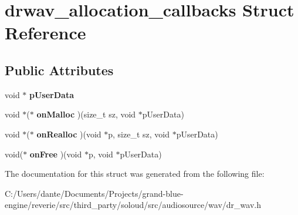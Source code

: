 \hypertarget{structdrwav__allocation__callbacks}{}\section{drwav\+\_\+allocation\+\_\+callbacks Struct Reference}
\label{structdrwav__allocation__callbacks}
\subsection*{Public Attributes}
\begin{DoxyCompactItemize}
\item 
\mbox{\label{structdrwav__allocation__callbacks_a8a89a9b5010d65bbf19c1cd128c5648c}} 
void $\ast$ {\bfseries p\+User\+Data}
\item 
\mbox{\label{structdrwav__allocation__callbacks_a74df91cadaae58ef5c33f243049e449a}} 
void $\ast$($\ast$ {\bfseries on\+Malloc} )(size\+\_\+t sz, void $\ast$p\+User\+Data)
\item 
\mbox{\label{structdrwav__allocation__callbacks_a41d2ba99f082ac22392d50357044ff02}} 
void $\ast$($\ast$ {\bfseries on\+Realloc} )(void $\ast$p, size\+\_\+t sz, void $\ast$p\+User\+Data)
\item 
\mbox{\label{structdrwav__allocation__callbacks_acad0ac9ca0b3c5dbb3dc6448d6c5e048}} 
void($\ast$ {\bfseries on\+Free} )(void $\ast$p, void $\ast$p\+User\+Data)
\end{DoxyCompactItemize}


The documentation for this struct was generated from the following file\+:\begin{DoxyCompactItemize}
\item 
C\+:/\+Users/dante/\+Documents/\+Projects/grand-\/blue-\/engine/reverie/src/third\+\_\+party/soloud/src/audiosource/wav/dr\+\_\+wav.\+h\end{DoxyCompactItemize}

